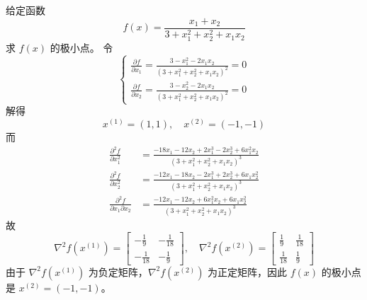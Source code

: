 

\newcommand\Title{最优化方法第8次作业}


\begin{problem}
    给定函数\[f(x) = \frac{x_1 + x_2}{3 + x_1^2 + x_2^2 + x_1x_2}\]求 $f(x)$ 的极小点。
    \Answer
    令 \[\begin{cases}
        \frac{\partial f}{\partial x_{1}}=\frac{3-x_{1}^{2}-2 x_{1} x_{2}}{\left(3+x_{1}^{2}+x_{2}^{2}+x_{1} x_{2}\right)^{2}}=0 \\
        \frac{\partial f}{\partial x_{2}}=\frac{3-x_{2}^{2}-2 x_{1} x_{2}}{\left(3+x_{1}^{2}+x_{2}^{2}+x_{1} x_{2}\right)^{2}}=0
    \end{cases}\]
    解得\[x^{(1)} = (1, 1), \quad x^{(2)} = (-1, -1)\]
    而 \begin{align*}
        \frac{\partial^{2} f}{\partial x_{1}^{2}}&=\frac{-18 x_{1}-12 x_{2}+2 x_{1}^{3}-2 x_{2}^{3}+6 x_{1}^{2} x_{2}}{\left(3+x_{1}^{2}+x_{2}^{2}+x_{1} x_{2}\right)^{3}} \\
        \frac{\partial^{2} f}{\partial x_{2}^{2}}&=\frac{-12 x_{1}-18 x_{2}-2 x_{1}^{3}+2 x_{2}^{3}+6 x_{1} x_{2}^{2}}{\left(3+x_{1}^{2}+x_{2}^{2}+x_{1} x_{2}\right)^{3}} \\
        \frac{\partial^{2} f}{\partial x_{1} \partial x_{2}}&=\frac{-12 x_{1}-12 x_{2}+6 x_{1}^{2} x_{2}+6 x_{1} x_{2}^{2}}{\left(3+x_{1}^{2}+x_{2}^{2}+x_{1} x_{2}\right)^{3}}
    \end{align*}
    故 \[\nabla^2 f(x^{(1)}) = \begin{bmatrix}
        -\frac{1}{9} & -\frac{1}{18} \\
        -\frac{1}{18} & -\frac{1}{9}
    \end{bmatrix}, \quad \nabla^2 f(x^{(2)}) = \begin{bmatrix}
        \frac{1}{9} & \frac{1}{18} \\
        \frac{1}{18} & \frac{1}{9}
    \end{bmatrix}\]
    由于 $\nabla^2f(x^{(1)})$ 为负定矩阵，$\nabla^2f(x^{(2)})$ 为正定矩阵，因此 $f(x)$ 的极小点是 $x^{(2)} = (-1, -1)$。
\end{problem}

